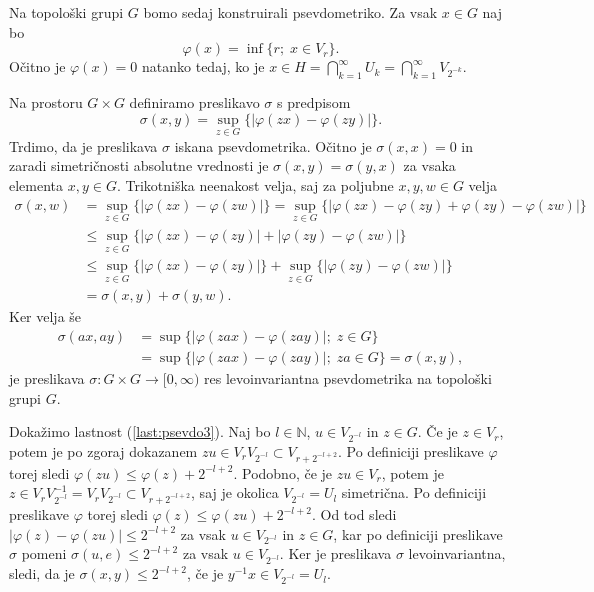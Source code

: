 \documentclass[mat1]{fmfdelo}
\newcommand{\N}{\mathbb N}
\begin{document}
\begin{dokaz}
Na topološki grupi $G$ bomo sedaj konstruirali psevdometriko. Za vsak $x \in G$ naj bo \[\varphi(x) = \inf\lbrace r ;\; x \in V_r \rbrace.\]
Očitno je $\varphi(x) = 0$ natanko tedaj, ko je $x \in H = \bigcap_{k=1}^{\infty} U_k = \bigcap_{k=1}^{\infty} V_{2^{-k}}$.

Na prostoru $G \times G$ definiramo preslikavo $\sigma$ s predpisom
\[ \sigma(x, y) = \sup_{z \in G}\lbrace |\varphi(zx) - \varphi(zy)| \rbrace. \]
Trdimo, da je preslikava $\sigma$ iskana psevdometrika.
Očitno je $\sigma(x, x) = 0$ in zaradi simetričnosti absolutne vrednosti je $\sigma(x, y) = \sigma(y, x)$ za vsaka elementa $x, y \in G$. Trikotniška neenakost velja, saj za poljubne $x, y, w \in G$ velja
\begin{align*}
\sigma(x, w) &= \sup_{z \in G}\lbrace |\varphi(zx) - \varphi(zw)| \rbrace 
= \sup_{z \in G}\lbrace |\varphi(zx) - \varphi(zy) + \varphi(zy) - \varphi(zw)| \rbrace \\
&\leq \sup_{z \in G}\lbrace |\varphi(zx) - \varphi(zy)| + |\varphi(zy) - \varphi(zw)| \rbrace \\
&\leq \sup_{z \in G}\lbrace |\varphi(zx) - \varphi(zy)| \rbrace + \sup_{z \in G}\lbrace |\varphi(zy) - \varphi(zw)| \rbrace \\
&= \sigma(x, y) + \sigma(y, w).
\end{align*}
Ker velja še
\begin{align*}
\sigma(ax, ay) &= \sup\lbrace |\varphi(zax) - \varphi(zay)| ;\; z \in G \rbrace \\
&= \sup\lbrace |\varphi(zax) - \varphi(zay)| ;\; za \in G \rbrace = \sigma(x, y),
\end{align*}
je preslikava $\sigma\colon G \times G \to [0, \infty)$ res levoinvariantna psevdometrika na topološki grupi $G$.

Dokažimo lastnost (\ref{last:psevdo3}). Naj bo $l \in \N$, $u \in V_{2^{-l}}$ in $z \in G$. Če je $z \in V_r$, potem je po zgoraj dokazanem $zu \in V_rV_{2^{-l}} \subset V_{r + 2^{-l+2}}$. Po definiciji preslikave $\varphi$ torej sledi $\varphi(zu) \leq \varphi(z) + 2^{-l+2}$. Podobno, če je $zu \in V_r$, potem je $z \in V_rV_{2^{-l}}^{-1} = V_rV_{2^{-l}} \subset V_{r + 2^{-l+2}}$, saj je okolica $V_{2^{-l}} = U_l$ simetrična. Po definiciji preslikave $\varphi$ torej sledi $\varphi(z) \leq \varphi(zu) + 2^{-l+2}$. Od tod sledi $|\varphi(z) - \varphi(zu)| \leq 2^{-l+2}$ za vsak $u \in V_{2^{-l}}$ in $z \in G$, kar po definiciji preslikave $\sigma$ pomeni $\sigma(u, e) \leq 2^{-l+2}$ za vsak $u \in V_{2^{-l}}$. Ker je preslikava $\sigma$ levoinvariantna, sledi, da je $\sigma(x, y) \leq 2^{-l+2}$, če je $y^{-1}x \in V_{2^{-l}} = U_l$.


\end{dokaz}
\end{document}
